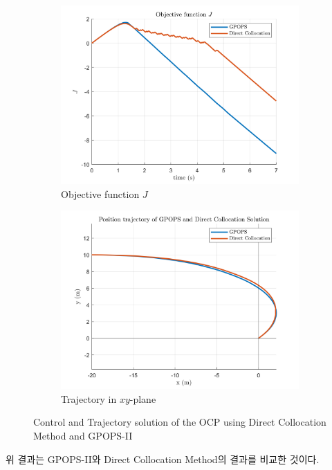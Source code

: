 \begin{figure}
	\begin{subfigure}[b]{0.49\linewidth}
		\includegraphics[width=\linewidth]{figures/GpopsDcolObj.png}
		\caption{Objective function $J$}
		\label{fig:dircol_obj}
	\end{subfigure}
	\hfill
	\begin{subfigure}[b]{0.49\linewidth}
		\includegraphics[width=\linewidth]{figures/GpopsDcolTraj.png}
		\caption{Trajectory in $xy$-plane}
		\label{fig:dircol_xy}
	\end{subfigure}
	\centering
	\caption{Control and Trajectory solution of the OCP using Direct Collocation Method and GPOPS-II}
	\label{fig:dircol_gpops_control}
\end{figure}
위 결과는 GPOPS-II와 Direct Collocation Method의 결과를 비교한 것이다.

